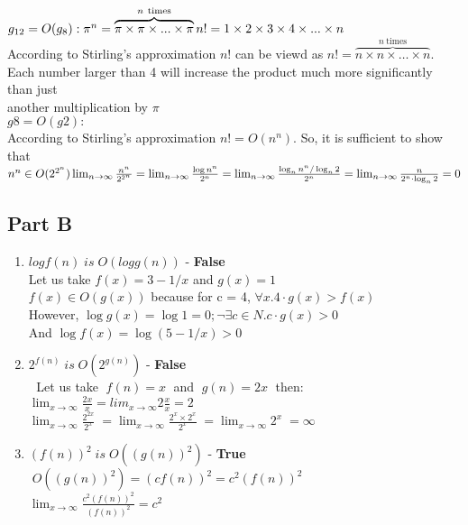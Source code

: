 \documentclass{article}
\begin{document}
$g_{12} = O(g_8):\\
\pi^{n} = \overbrace{\pi \times \pi \times ... \times \pi}^{n \mathrm
{\ times}}\\
n! = 1 \times 2 \times 3 \times 4 \times ... \times n$\\
According to Stirling's approximation $n!$ can be viewd as 
$n! = \overbrace{n \times n \times \ldots \times n}^{n \mathrm {\ times}} $.
Each number larger than 4 will increase the product much more significantly
than just\\ another multiplication by $\pi$\\

$g8 = O(g2):$\\
 According to Stirling's approximation $n! = O(n^n)$. So, it is
sufficient to show that $n^n \in O(2^{2^n})\\
\lim_{n\to\infty}\frac{n^n}{2^{2^n}} = 
\lim_{n\to\infty}\frac{\log n^n}{2^n} = 
\lim_{n\to\infty}\frac{\log_n n^n/\log_n2}{2^n} = 
\lim_{n\to\infty}\frac{n}{2^n\cdot\log_n2} = 0$\\
\clearpage

\subsection*{Part B}
\begin{enumerate}
  \item $log {f(n)} \; is \; O(log {g(n)})$ - \textbf{False}
    \\ Let us take $f(x) = 3 - 1/x$ and $g(x) = 1$\\
    $f(x) \in O(g(x))$ because for c = 4, $\forall x. 4\cdot{g(x)>f(x)}$\\
    However, $\log{g(x)}=\log{1}=0; \neg\exists c \in N$.$c \cdot{g(x)}> 0$\\
    And $\log{f(x)} = \log{(5-1/x)} > 0$
  \item $2^{f(n)} \; is \; O(2^{g(n)})$ - \textbf{False}
    \\ $\; $ Let us take $\; f(n) = x \;$ and $\; g(n) = 2x \;$ then:
    \\ $\lim_{x\to\infty}\frac{2x}{x} = lim_{x\to\infty}2\frac{x}{x} = 2$
    \\ $\lim_{x\to\infty}\frac{2^{2x}}{2^x} \; =
        \lim_{x\to\infty}\frac{2^x \times 2^x}{2^x} \; =
        \lim_{x\to\infty}{2^x} \; = \infty$
  \item $(f(n))^2 \; is \; O((g(n))^2)$ - \textbf{True}
    \\ $\; O((g(n))^2) = (cf(n))^2 = c^2(f(n))^2$
    \\ $\lim_{x\to\infty}\frac{c^2(f(n))^2}{(f(n))^2} = c^2$
\end{enumerate}
\clearpage
\end{document}
